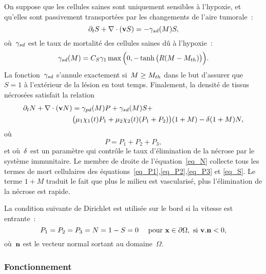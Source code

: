\documentclass[main.tex]{subfiles}
\begin{document}
On suppose que les cellules saines sont uniquement sensibles à l'hypoxie, et qu'elles sont passivement transportées par les changements de l'aire tumorale~:
\begin{equation}
\partial_t S + \nabla\cdot(\mathbf{v} S) =  -\gamma_{sd}(M) S, \label{eq_S}
\end{equation}
où~$\gamma_{sd}$ est le taux de mortalité des cellules saines dû à l'hypoxie~:
\begin{equation}
\gamma_{sd}(M)=C_S \gamma_1  \max\Big(0,-\tanh\big(R(M-M_{th})\big)\Big). \label{eq_gammasd}
\end{equation}
La fonction~$\gamma_{sd}$  s'annule exactement si~$M\geq M_{th}$ dans le but d'assurer que~$S=1$ à l'extérieur de la lésion en tout temps. Finalement, la densité de tissus nécrosées satisfait la relation 
\begin{equation}\label{eq_N}
\begin{aligned}
\partial_t N + \nabla\cdot(\mathbf{v} N) & =  \gamma_{pd}(M) P +\gamma_{sd}(M) S  + \\ & \big(\mu_1 \chi_1(t)P_1 + \mu_2\chi_2(t)(P_1+P_2)\big)(1+M) - \delta(1+M)N,
\end{aligned}\end{equation}
où
\begin{equation}
P = P_1+P_2+P_3,
\end{equation}
et où~$\delta$ est un paramètre qui contrôle le taux d'élimination de la nécrose par le système immunitaire. 
Le membre de droite de l'équation~\eqref{eq_N} collecte tous les termes de mort cellulaires des équations~\eqref{eq_P1},\eqref{eq_P2},\eqref{eq_P3} et \eqref{eq_S}. 
Le terme $1+M$ traduit le fait que plus le milieu est vascularisé, plus l'élimination de la nécrose est rapide. 


La condition suivante de Dirichlet est utilisée sur le bord si la vitesse est entrante~:
\begin{equation}\label{eq_CL_pop}
P_1=P_2=P_3=N=1-S=0  \quad \textrm{ pour } \mathbf{x} \in \partial \Omega, \textrm{ si } \mathbf{v}.{\bf n}<0,
\end{equation}
où~${\bf n}$ est le vecteur normal sortant au domaine~$\Omega$.
\subsubsection{Fonctionnement}
\end{document}
